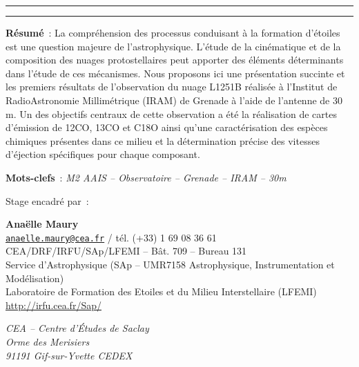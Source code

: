 \documentclass[a4paper,10pt,french]{article}
\begin{document}
\begin{center}

    \vspace{1.5cm}

    \rule[11pt]{5cm}{0.5pt}

    \textbf{\huge \thetitle}

    \rule{5cm}{0.5pt}

    \vspace{1.5cm}

    \parbox{15cm}{\textbf{Résumé} :
    La compréhension des processus conduisant à la formation d'étoiles est une question majeure de l'astrophysique. L'étude de la cinématique et de la composition des nuages protostellaires peut apporter des éléments déterminants dans l'étude de ces mécanismes. Nous proposons ici une présentation succinte et les premiers résultats de l'observation du nuage L1251B réalisée à l'Institut de RadioAstronomie Millimétrique (IRAM) de Grenade à l'aide de l'antenne de 30 m. Un des objectifs centraux de cette observation a été la réalisation de cartes d'émission de 12CO, 13CO et C18O ainsi qu'une caractérisation des espèces chimiques présentes dans ce milieu et la détermination précise des vitesses d'éjection spécifiques pour chaque composant.
    }
    

    \vspace{0.5cm}

    \parbox{15cm}{
        \textbf{Mots-clefs} : \it M2 AAIS – Observatoire – Grenade – IRAM – 30m
    }

    \vspace{0.5cm}

    \parbox{15cm}{
        Stage encadré par :

        \textbf{Anaëlle Maury} \\
        \href{mailto:anaelle.maury@cea.fr}{\tt anaelle.maury@cea.fr} / tél. (+33) 1 69 08 36 61 \\
        CEA/DRF/IRFU/SAp/LFEMI – Bât. 709 – Bureau 131 \\
        Service d’Astrophysique (SAp – UMR7158 Astrophysique, Instrumentation et Modélisation) \\
        Laboratoire de Formation des Etoiles et du Milieu Interstellaire (LFEMI) \\
        \url{http://irfu.cea.fr/Sap/}

        \textit{%
            CEA – Centre d’Études de Saclay \\
            Orme des Merisiers \\
            91191 Gif-sur-Yvette CEDEX
        }
    }


\end{center}
\end{document}

